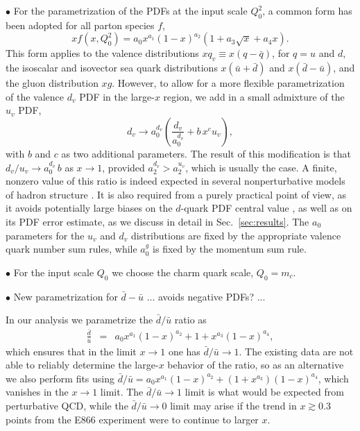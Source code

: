 \documentclass[aps,prd,amsmath,preprint]{revtex4}
\begin{document}
$\bullet$
For the parametrization of the PDFs at the input scale $Q_0^2$,
a common form has been adopted for all parton species $f$,
%
\begin{equation}
xf(x,Q_0^2) = a_0 x^{a_1} (1-x)^{a_2} (1 + a_3 \sqrt{x} + a_4 x).
\label{eq:param}
\end{equation}   
%
This form applies to the valence distributions
  $xq_v \equiv x(q-\bar q)$, for $q=u$ and $d$,
the isoscalar and isovector sea quark distributions
  $x(\bar u + \bar d)$ and $x(\bar d - \bar u)$,
and the gluon distribution $xg$.
However, to allow for a more flexible parametrization of the valence
$d_v$ PDF in the large-$x$ region, we add in a small admixture of the
$u_v$ PDF,
%
\begin{equation}
d_v \rightarrow
    a_0^{d_v} \left( \frac{d_v}{a_0^{d_v}} + b\, x^c u_v \right),
\label{eq:du}
\end{equation}
%
with $b$ and $c$ as two additional parameters.
The result of this modification is that
	$d_v/u_v \to a_0^{d_v}\, b$ as $x \to 1$,
provided $a_2^{d_v} > a_2^{u_v}$, which is usually the case.
A finite, nonzero value of this ratio is indeed expected in several
nonperturbative models of hadron structure \cite{FJ75, MT96, HR10}.
It is also required from a purely practical point of view, as it avoids
potentially large biases on the $d$-quark PDF central value \cite{CJ11},
as well as on its PDF error estimate, as we discuss in detail in
Sec.~\ref{sec:results}.
The $a_0$ parameters for the $u_v$ and $d_v$ distributions are fixed
by the appropriate valence quark number sum rules, while $a_0^g$ is
fixed by the momentum sum rule.


$\bullet$
For the input scale $Q_0$ we choose the charm quark scale, $Q_0 = m_c$.


$\bullet$
New parametrization for $\bar d - \bar u$ ... avoids negative PDFs?
...


In our analysis we parametrize the $\bar d/\bar u$ ratio as
%
\begin{eqnarray}
\frac{\bar d}{\bar u}
&=& a_0 x^{a_1} (1-x)^{a_2} + 1 + x^{a_3} (1-x)^{a_4},
\end{eqnarray}
%
which ensures that in the limit $x \to 1$ one has $\bar d/\bar u \to 1$.
%
The existing data are not able to reliably determine the large-$x$
behavior of the ratio, so as an alternative we also perform fits
using
$\bar d/\bar u = a_0 x^{a_1} (1-x)^{a_2} + (1 + x^{a_3}) (1-x)^{a_4}$,
which vanishes in the $x \to 1$ limit.
The $\bar d/\bar u \to 1$ limit is what would be expected from
perturbative QCD, while the $\bar d/\bar u \to 0$ limit may arise
if the trend in $x \gtrsim 0.3$ points from the E866 experiment
\cite{E866} were to continue to larger $x$.
\end{document}
